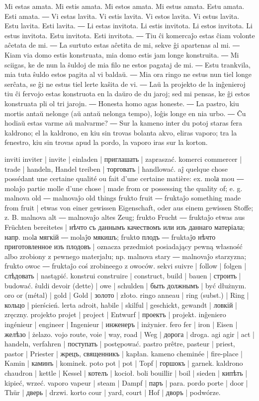 Mi estas amata. Mi estis amata. Mi estos amata. Mi estus amata. Estu amata. Esti amata. ― Vi estas lavita. Vi estis lavita. Vi estos lavita. Vi estus lavita. Estu lavita. Esti lavita. ― Li estas invitota. Li estis invitota. Li estos invitota. Li estus invitota. Estu invitota. Esti invitota. ― Tiu ĉi komercaĵo estas ĉiam volonte aĉetata de mi. ― La surtuto estas aĉetita de mi, sekve ĝi apartenas al mi. ― Kiam via domo estis konstruata, mia domo estis jam longe konstruita. ― Mi sciigas, ke de nun la ŝuldoj de mia filo ne estos pagataj de mi. ― Estu trankvila, mia tuta ŝuldo estos pagita al vi baldaŭ. ― Mia ora ringo ne estus nun tiel longe serĉata, se ĝi ne estus tiel lerte kaŝita de vi. ― Laŭ la projekto de la inĝenieroj tiu ĉi fervojo estas konstruota en la daŭro de du jaroj; sed mi pensas, ke ĝi estos konstruata pli ol tri jarojn. ― Honesta homo agas honeste. ― La pastro, kiu mortis antaŭ nelonge (aŭ antaŭ nelonga tempo), loĝis longe en nia urbo. ― Ĉu hodiaŭ estas varme aŭ malvarme? ― Sur la kameno inter du potoj staras fera kaldrono; el la kaldrono, en kiu sin trovas bolanta akvo, eliras vaporo; tra la fenestro, kiu sin trovas apud la pordo, la vaporo iras sur la korton.

inviti inviter | invite | einladen | приглашать | zapraszać.
komerci commercer | trade | handeln, Handel treiben | торговать | handlować.
aĵ quelque chose possédant une certaine qualité ou fait d’une certaine matière: ex. molа mou ― molaĵo partie molle d’une chose | made from or possessing the quality of; e. g. malnova old ― malnovaĵo old things frukto fruit ― fruktaĵo something made from fruit | etwas von einer gewissen Eigenschaft, oder aus einem gewissen Stoffe; z. B. malnova alt ― malnovaĵo altes Zeug; frukto Frucht ― fruktaĵo etwas aus Früchten bereitetes | нѣчто съ даннымъ качествомъ или изъ даннаго матеріала; напр. molа мягкій ― molaĵо мякишъ; fruktо плодъ ― fruktaĵо нѣчто приготовленное изъ плодовъ | oznacza przedmiot posiadający pewną własność albo zrobiony z pewnego materjału; np. malnova stary ― malnovaĵo starzyzna; frukto owoc ― fruktaĵo coś zrobineego z owoców.
sekvi suivre | follow | folgen | слѣдовать | nastąpić.
konstrui construire | construct, build | bauen | строить | budować.
ŝuldi devoir (dette) | owe | schulden | быть должнымъ | być dłużnym.
oro or (métal) | gold | Gold | золото | złoto.
ringo anneau | ring (subst.) | Ring | кольцо | pierścień.
lerta adroit, habile | skilful | geschickt, gewandt | ловкій | zręczny.
projekto projet | project | Entwurf | проектъ | projekt.
inĝeniero ingénieur | engineer | Ingenieur | инженеръ | inżynier.
fero fer | iron | Eisen | желѣзо | żelazo.
vojo route, voie | way, road | Weg | дорога | droga.
agi agir | act | handeln, verfahren | поступать | postępować.
pastro prêtre, pasteur | priest, pastor | Priester | жрецъ, священникъ | kapłan.
kameno cheminée | fire-place | Kamin | каминъ | kominek.
poto pot | pot | Topf | горшокъ | garnek.
kaldrono chaudron | kettle | Kessel | котелъ | kocioł.
boli bouillir | boil | sieden | кипѣть | kipieć, wrzeć.
vaporo vapeur | steam | Dampf | паръ | para.
pordo porte | door | Thür | дверь | drzwi.
korto cour | yard, court | Hof | дворъ | podwórze.

